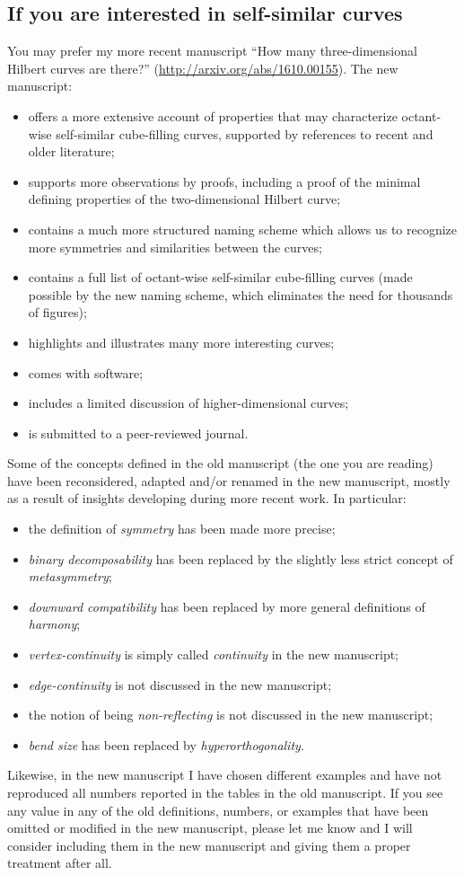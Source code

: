 \documentclass[11pt,a4paper]{article}
\begin{document}
\subsection*{If you are interested in self-similar curves}
You may prefer my more recent manuscript ``How many three-dimensional Hilbert curves are there?'' (\url{http://arxiv.org/abs/1610.00155}). The new manuscript:\begin{itemize}
\item offers a more extensive account of properties that may characterize octant-wise self-similar cube-filling curves, supported by references to recent and older literature;
\item supports more observations by proofs, including a proof of the minimal defining properties of the two-dimensional Hilbert curve;
\item contains a much more structured naming scheme which allows us to recognize more symmetries and similarities between the curves;
\item contains a full list of octant-wise self-similar cube-filling curves (made possible by the new naming scheme, which eliminates the need for thousands of figures);
\item highlights and illustrates many more interesting curves;
\item comes with software;
\item includes a limited discussion of higher-dimensional curves;
\item is submitted to a peer-reviewed journal.
\end{itemize}
Some of the concepts defined in the old manuscript (the one you are reading) have been reconsidered, adapted and/or renamed in the new manuscript, mostly as a result of insights developing during more recent work. In particular:\begin{itemize}
\item the definition of \emph{symmetry} has been made more precise;
\item \emph{binary decomposability} has been replaced by the slightly less strict concept of \emph{metasymmetry};
\item \emph{downward compatibility} has been replaced by more general definitions of \emph{harmony};
\item \emph{vertex-continuity} is simply called \emph{continuity} in the new manuscript;
\item \emph{edge-continuity} is not discussed in the new manuscript;
\item the notion of being \emph{non-reflecting} is not discussed in the new manuscript;
\item \emph{bend size} has been replaced by \emph{hyperorthogonality}.
\end{itemize}
Likewise, in the new manuscript I have chosen different examples and have not reproduced all numbers reported in the tables in the old manuscript. If you see any value in any of the old definitions, numbers, or examples that have been omitted or modified in the new manuscript, please let me know and I will consider including them in the new manuscript and giving them a proper treatment after all.
\end{document}
